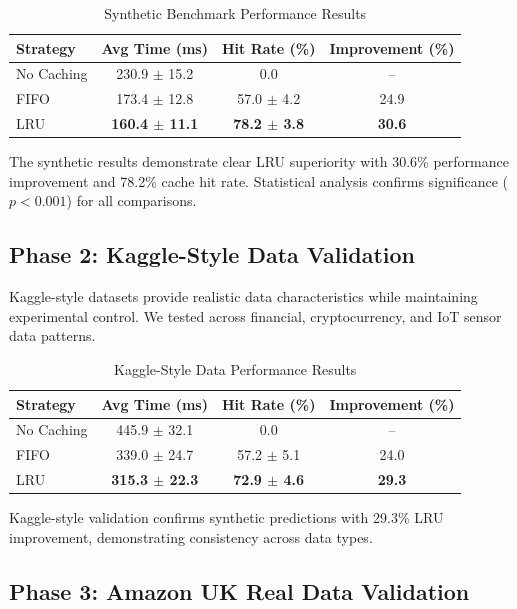 \documentclass[conference]{IEEEtran}
\begin{document}
\begin{table}[H]
\centering
\caption{Synthetic Benchmark Performance Results}
\label{tab:synthetic_results}
\begin{tabular}{@{}lccc@{}}
\toprule
\textbf{Strategy} & \textbf{Avg Time (ms)} & \textbf{Hit Rate (\%)} & \textbf{Improvement (\%)} \\
\midrule
No Caching & 230.9 $\pm$ 15.2 & 0.0 & -- \\
FIFO & 173.4 $\pm$ 12.8 & 57.0 $\pm$ 4.2 & 24.9 \\
LRU & \textbf{160.4 $\pm$ 11.1} & \textbf{78.2 $\pm$ 3.8} & \textbf{30.6} \\
\bottomrule
\end{tabular}
\end{table}

The synthetic results demonstrate clear LRU superiority with 30.6\% performance improvement and 78.2\% cache hit rate. Statistical analysis confirms significance ($p < 0.001$) for all comparisons.

\subsection{Phase 2: Kaggle-Style Data Validation}

Kaggle-style datasets provide realistic data characteristics while maintaining experimental control. We tested across financial, cryptocurrency, and IoT sensor data patterns.

\begin{table}[H]
\centering
\caption{Kaggle-Style Data Performance Results}
\label{tab:kaggle_results}
\begin{tabular}{@{}lccc@{}}
\toprule
\textbf{Strategy} & \textbf{Avg Time (ms)} & \textbf{Hit Rate (\%)} & \textbf{Improvement (\%)} \\
\midrule
No Caching & 445.9 $\pm$ 32.1 & 0.0 & -- \\
FIFO & 339.0 $\pm$ 24.7 & 57.2 $\pm$ 5.1 & 24.0 \\
LRU & \textbf{315.3 $\pm$ 22.3} & \textbf{72.9 $\pm$ 4.6} & \textbf{29.3} \\
\bottomrule
\end{tabular}
\end{table}

Kaggle-style validation confirms synthetic predictions with 29.3\% LRU improvement, demonstrating consistency across data types.

\subsection{Phase 3: Amazon UK Real Data Validation}
\end{document}
